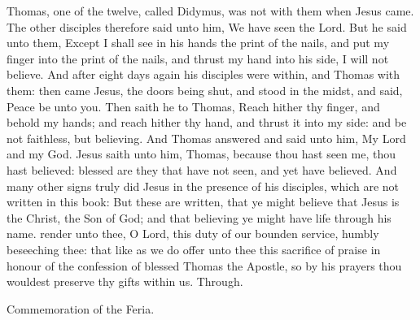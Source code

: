 
 Thomas, one of the twelve, called Didymus, was not with them when Jesus came. The other disciples therefore said unto him, We have seen the Lord. But he said unto them, Except I shall see in his hands the print of the nails, and put my finger into the print of the nails, and thrust my hand into his side, I will not believe. And after eight days again his disciples were within, and Thomas with them: then came Jesus, the doors being shut, and stood in the midst, and said, Peace be unto you. Then saith he to Thomas, Reach hither thy finger, and behold my hands; and reach hither thy hand, and thrust it into my side: and be not faithless, but believing. And Thomas answered and said unto him, My Lord and my God. Jesus saith unto him, Thomas, because thou hast seen me, thou hast believed: blessed are they that have not seen, and yet have believed. And many other signs truly did Jesus in the presence of his disciples, which are not written in this book: But these are written, that ye might believe that Jesus is the Christ, the Son of God; and that believing ye might have life through his name.
\secret
{} render unto thee, O Lord, this duty of our bounden service, humbly beseeching thee: that like as we do offer unto thee this sacrifice of praise in honour of the confession of blessed Thomas the Apostle, so by his prayers thou wouldest preserve thy gifts within us. Through.
\begin{rubric}
    Commemoration of the Feria.%
\end{rubric}
